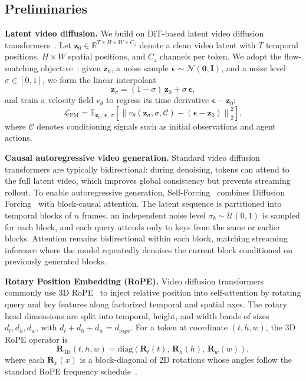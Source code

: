 \subsection{Preliminaries}
\label{sec:preliminaries}

\noindent\textbf{Latent video diffusion.}
We build on DiT-based latent video diffusion transformers~\cite{peebles2023scalable,wan}.
Let $\mathbf{z}_0\in\mathbb{R}^{T\times H\times W\times C_z}$ denote a clean video latent with $T$ temporal positions, $H\times W$ spatial positions, and $C_z$ channels per token.
We adopt the flow-matching objective~\cite{lipman2022flow}: given $\mathbf{z}_0$, a noise sample $\boldsymbol{\epsilon}\sim\mathcal{N}(\mathbf{0},\mathbf{I})$, and a noise level $\sigma\in[0,1]$, we form the linear interpolant
\begin{equation}
\mathbf{z}_{\sigma}=(1-\sigma)\,\mathbf{z}_0+\sigma\,\boldsymbol{\epsilon},
\end{equation}
and train a velocity field $v_\theta$ to regress its time derivative $\boldsymbol{\epsilon}-\mathbf{z}_0$:
\begin{equation}
\mathcal{L}_{\mathrm{FM}}
=
\mathbb{E}_{\mathbf{z}_0,\,\boldsymbol{\epsilon},\,\sigma}\!\left[
\left\|v_{\theta}(\mathbf{z}_{\sigma},\sigma,\mathcal{C})-(\boldsymbol{\epsilon}-\mathbf{z}_0)\right\|_2^2
\right],
\end{equation}
where $\mathcal{C}$ denotes conditioning signals such as initial observations and agent actions.


\noindent\textbf{Causal autoregressive video generation.}
Standard video diffusion transformers are typically bidirectional: during denoising, tokens can attend to the full latent video, which improves global consistency but prevents streaming rollout.
To enable autoregressive generation, Self-Forcing~\cite{huang2025self} combines Diffusion Forcing~\cite{chen2024diffusion} with block-causal attention.
The latent sequence is partitioned into temporal blocks of $n$ frames, an independent noise level $\sigma_b\sim\mathcal{U}(0,1)$ is sampled for each block, and each query attends only to keys from the same or earlier blocks.
Attention remains bidirectional within each block, matching streaming inference where the model repeatedly denoises the current block conditioned on previously generated blocks.

\noindent\textbf{Rotary Position Embedding (RoPE).}
Video diffusion transformers commonly use 3D RoPE~\cite{rope} to inject relative position into self-attention by rotating query and key features along factorized temporal and spatial axes.
The rotary head dimensions are split into temporal, height, and width bands of sizes $d_t,d_h,d_w$, with $d_t+d_h+d_w=d_{\mathrm{rope}}$.
For a token at coordinate $(t,h,w)$, the 3D RoPE operator is
\begin{equation}
\mathbf{R}_{\mathrm{3D}}(t,h,w)
=
\mathrm{diag}\!\left(\mathbf{R}_{t}(t),\,\mathbf{R}_{h}(h),\,\mathbf{R}_{w}(w)\right),
\end{equation}
where each $\mathbf{R}_x(x)$ is a block-diagonal of 2D rotations whose angles follow the standard RoPE frequency schedule~\cite{rope}.

